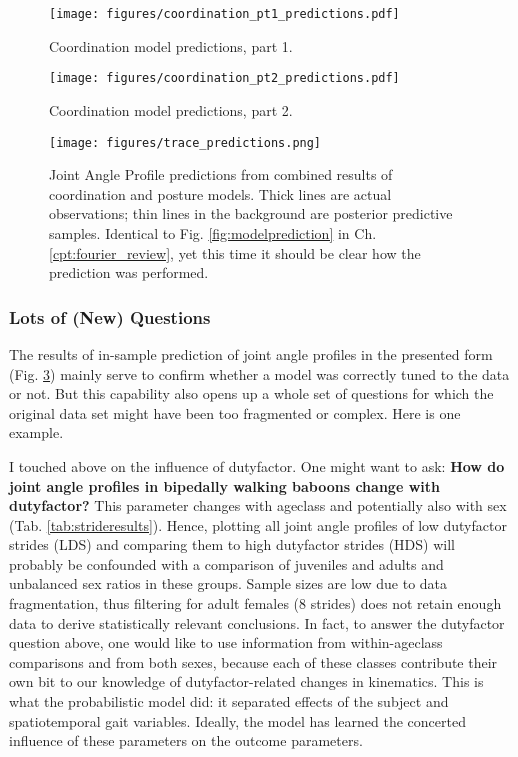 \begin{figure}[h!]
\centering
\texttt{[image: figures/coordination\_pt1\_predictions.pdf]}
\caption{\label{fig:coordination1}Coordination model predictions, part 1.}
\end{figure}

\begin{figure}[h!]
\centering
\texttt{[image: figures/coordination\_pt2\_predictions.pdf]}
\caption{\label{fig:coordination2}Coordination model predictions, part 2.}
\end{figure}


\begin{figure}[h!]
\centering
\texttt{[image: figures/trace\_predictions.png]}
\caption{\label{fig:japprediction}Joint Angle Profile predictions from combined results of coordination and posture models. Thick lines are actual observations; thin lines in the background are posterior predictive samples. Identical to Fig. \ref{fig:modelprediction} in Ch. \ref{cpt:fourier_review}, yet this time it should be clear how the prediction was performed.}
\end{figure}


\FloatBarrier\clearpage
\subsubsection{Lots of (New) Questions}
\label{sec:orgc1e641b}
The results of in-sample prediction of joint angle profiles in the presented form (Fig. \ref{fig:japprediction}) mainly serve to confirm whether a model was correctly tuned to the data or not.
But this capability also opens up a whole set of questions for which the original data set might have been too fragmented or complex.
Here is one example.


I touched above on the influence of dutyfactor.
One might want to ask:
\textbf{How do joint angle profiles in bipedally walking baboons change with dutyfactor?}
This parameter changes with ageclass and potentially also with sex (Tab. \ref{tab:strideresults}).
Hence, plotting all joint angle profiles of low dutyfactor strides (LDS) and comparing them to high dutyfactor strides (HDS) will probably be confounded with a comparison of juveniles and adults and unbalanced sex ratios in these groups.
Sample sizes are low due to data fragmentation, thus filtering for adult females (8 strides) does not retain enough data to derive statistically relevant conclusions.
In fact, to answer the dutyfactor question above, one would like to use information from within-ageclass comparisons and from both sexes, because each of these classes contribute their own bit to our knowledge of dutyfactor-related changes in kinematics.
This is what the probabilistic model did: it separated effects of the subject and spatiotemporal gait variables.
Ideally, the model has learned the concerted influence of these parameters on the outcome parameters.


